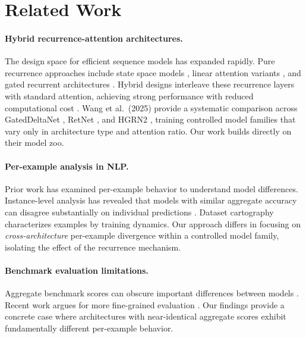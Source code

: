 \documentclass[11pt]{article}
\begin{document}
\section{Related Work}

\paragraph{Hybrid recurrence-attention architectures.}
The design space for efficient sequence models has expanded rapidly. Pure recurrence approaches include state space models \citep{gu2024mamba}, linear attention variants \citep{katharopoulos2020transformers}, and gated recurrent architectures \citep{qin2024hgrn2}. Hybrid designs interleave these recurrence layers with standard attention, achieving strong performance with reduced computational cost \citep{waleffe2024empirical,de2024griffin}. Wang et al.\ (2025) provide a systematic comparison across GatedDeltaNet \citep{yang2024gated}, RetNet \citep{sun2023retentive}, and HGRN2 \citep{qin2024hgrn2}, training controlled model families that vary only in architecture type and attention ratio. Our work builds directly on their model zoo.

\paragraph{Per-example analysis in NLP.}
Prior work has examined per-example behavior to understand model differences. Instance-level analysis has revealed that models with similar aggregate accuracy can disagree substantially on individual predictions \citep{mccoy2020berts}. Dataset cartography \citep{swayamdipta2020dataset} characterizes examples by training dynamics. Our approach differs in focusing on \emph{cross-architecture} per-example divergence within a controlled model family, isolating the effect of the recurrence mechanism.

\paragraph{Benchmark evaluation limitations.}
Aggregate benchmark scores can obscure important differences between models \citep{dehghani2021benchmark}. Recent work argues for more fine-grained evaluation \citep{gehrmann2022repairing}. Our findings provide a concrete case where architectures with near-identical aggregate scores exhibit fundamentally different per-example behavior.
\end{document}
